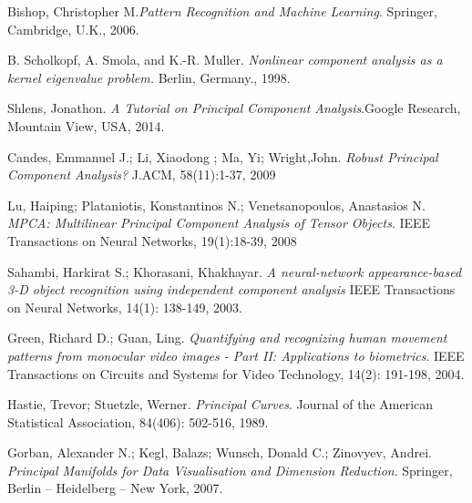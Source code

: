 \begin{thebibliography}{9}

 Bishop, Christopher M.\textit{Pattern Recognition and Machine Learning}. Springer, Cambridge, U.K., 2006.
 
B. Scholkopf, A. Smola, and K.-R. Muller.
\textit{Nonlinear component analysis as a kernel eigenvalue problem.}  Berlin, Germany., 1998.

 Shlens, Jonathon. \textit{A Tutorial on Principal Component Analysis}.Google Research, Mountain View, USA, 2014.

 Candes, Emmanuel J.; Li, Xiaodong ; Ma, Yi; Wright,John. \textit{Robust Principal Component Analysis?} J.ACM, 58(11):1-37, 2009 
 
 Lu, Haiping; Plataniotis, Konstantinos N.; Venetsanopoulos,  
 Anastasios N. 
 \textit{MPCA: Multilinear Principal Component Analysis of Tensor Objects}.  IEEE Transactions on Neural Networks, 19(1):18-39, 2008
 
 Sahambi, Harkirat S.; Khorasani, Khakhayar. \textit{A neural-network appearance-based 3-D object recognition using independent component analysis} IEEE Transactions on Neural Networks, 14(1): 138-149, 2003. 
 
 Green, Richard D.; Guan, Ling. \textit{Quantifying and recognizing human movement patterns from monocular video images - Part II: Applications to biometrics}. IEEE Transactions on Circuits and Systems for Video Technology, 14(2): 191-198, 2004. 
 
 Hastie, Trevor; Stuetzle, Werner. \textit{Principal Curves}. Journal of the American Statistical Association, 84(406): 502-516, 1989.

 Gorban,  Alexander N.; Kegl, Balazs; Wunsch, Donald C.; Zinovyev, Andrei. \textit{Principal Manifolds for Data Visualisation and Dimension Reduction}. Springer, Berlin – Heidelberg – New York, 2007. 
\end{thebibliography}

